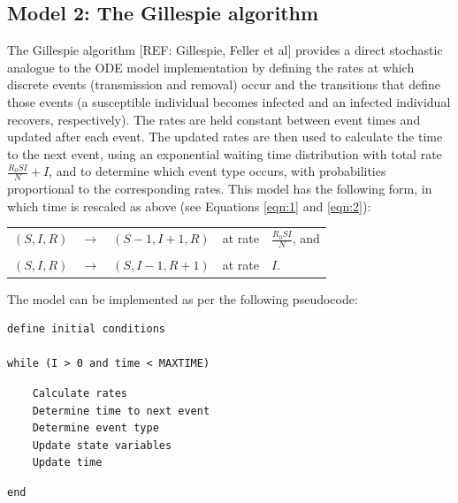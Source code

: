 \documentclass[margin,line,11pt]{article}
\begin{document}

\subsection{Model 2: The Gillespie algorithm}

The Gillespie algorithm [REF: Gillespie, Feller et al] provides a direct stochastic analogue to the ODE model implementation by defining the rates at which discrete events (transmission and removal) occur and the transitions that define those events (a susceptible individual becomes infected and an infected individual recovers, respectively). 
The rates are held constant between event times and updated after each event. 
The updated rates are then used to calculate the time to the next event, using an exponential waiting time distribution with total rate $\frac{R_0 S I}{N} + I$, and to determine which event type occurs, with probabilities proportional to the corresponding rates. 
This model has the following form, in which time is rescaled as above (see Equations \ref{eqn:1} and \ref{eqn:2}):

\begin{table}[htb]
\begin{center}
\begin{tabular}[tb]{ccccl}
$(S,I,R)$ & $\rightarrow$ & $(S-1,I+1,R)$ & at rate & $\frac{R_0 S I}{N}$, and\\ 
&&&&\\
$(S,I,R)$ & $\rightarrow$ & $(S,I-1,R+1)$ & at rate & $I$.
\end{tabular}
\end{center}
\end{table}

\noindent The model can be implemented as per the following pseudocode:\\

\hfill\begin{minipage}{\dimexpr\textwidth-5cm}
\begin{verbatim}
define initial conditions

while (I > 0 and time < MAXTIME)
\end{verbatim}
\hfill\begin{minipage}{\dimexpr\textwidth-1cm}
\begin{verbatim}
	Calculate rates
	Determine time to next event 
	Determine event type
	Update state variables 
	Update time
\end{verbatim}
\end{minipage}
\begin{verbatim}
end
\end{verbatim}
\xdef\tpd{\the\prevdepth}
\end{minipage}
\vspace{0.5cm}
\end{document}
